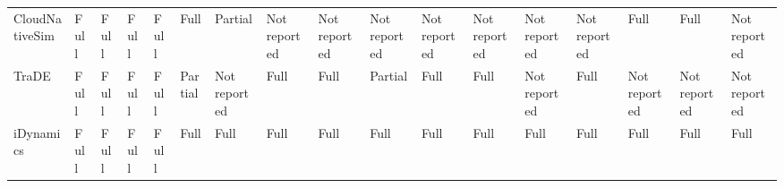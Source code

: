 \begin{table}[t]
\begin{tabular}{lllllllllllllllll}
CloudNativeSim & Full & Full & Full & Full & Full & Partial & Not reported & Not reported & Not reported & Not reported & Not reported & Not reported & Not reported & Full & Full & Not reported \\
TraDE & Full & Full & Full & Full & Partial & Not reported & Full & Full & Partial & Full & Full & Not reported & Full & Not reported & Not reported & Not reported \\
iDynamics & Full & Full & Full & Full & Full & Full & Full & Full & Full & Full & Full & Full & Full & Full & Full & Full \\
\bottomrule
\end{tabular}
\end{table}
